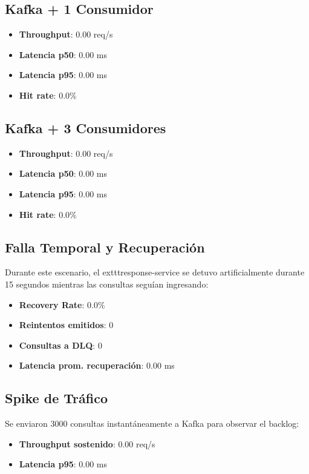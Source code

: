 \documentclass[letter,12pt]{article}
\begin{document}
\subsection{Kafka + 1 Consumidor}
\begin{itemize}
    \item \textbf{Throughput}: 0.00 req/s
    \item \textbf{Latencia p50}: 0.00 ms
    \item \textbf{Latencia p95}: 0.00 ms
    \item \textbf{Hit rate}: 0.0\%
\end{itemize}

\subsection{Kafka + 3 Consumidores}
\begin{itemize}
    \item \textbf{Throughput}: 0.00 req/s
    \item \textbf{Latencia p50}: 0.00 ms
    \item \textbf{Latencia p95}: 0.00 ms
    \item \textbf{Hit rate}: 0.0\%
\end{itemize}

\subsection{Falla Temporal y Recuperaci\'on}
Durante este escenario, el 	exttt{response-service} se detuvo artificialmente durante 15 segundos mientras las consultas segu\'ian ingresando:
\begin{itemize}
    \item \textbf{Recovery Rate}: 0.0\%
    \item \textbf{Reintentos emitidos}: 0
    \item \textbf{Consultas a DLQ}: 0
    \item \textbf{Latencia prom. recuperaci\'on}: 0.00 ms
\end{itemize}

\subsection{Spike de Tr\'afico}
Se enviaron 3000 consultas instant\'aneamente a Kafka para observar el backlog:
\begin{itemize}
    \item \textbf{Throughput sostenido}: 0.00 req/s
    \item \textbf{Latencia p95}: 0.00 ms
\end{itemize}
\end{document}
